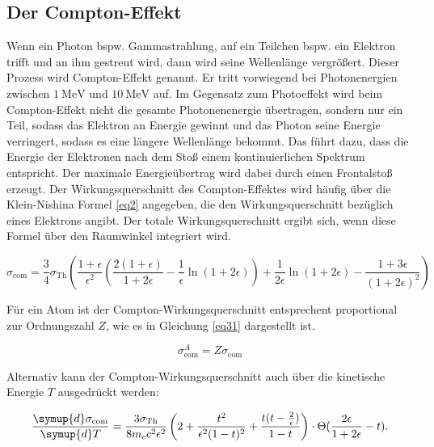 \subsection{Der Compton-Effekt}
Wenn ein Photon bspw. Gammastrahlung, auf ein Teilchen bspw. ein Elektron trifft
und an ihm gestreut wird, dann wird seine Wellenlänge vergrößert. 
Dieser Prozess wird Compton-Effekt genannt.
Er tritt vorwiegend bei Photonenergien zwischen $\SI{1}{\mega\electronvolt}$ und 
$\SI{10}{\mega\electronvolt}$ auf.
Im Gegensatz zum Photoeffekt wird beim Compton-Effekt nicht die 
gesamte Photonenenergie übertragen, sondern nur ein Teil, sodass das Elektron an 
Energie gewinnt und das Photon seine Energie verringert, sodass es eine längere 
Wellenlänge bekommt. Das führt dazu, dass die Energie der Elektronen nach dem 
Stoß einem kontinuierlichen Spektrum entspricht.
Der maximale Energieübertrag wird dabei durch einen Frontalstoß erzeugt.
Der Wirkungsquerschnitt des Compton-Effektes wird häufig über die 
Klein-Nishina Formel \ref{eq2} angegeben, die den Wirkungsquerschnitt bezüglich 
eines Elektrons angibt. Der totale Wirkungsquerschnitt ergibt sich, wenn diese 
Formel über den Raumwinkel integriert wird.

\begin{equation}
    \sigma_{\text{com}} = \frac{3}{4}\sigma_{\text{Th}} \left(\frac{1 + \epsilon}{\epsilon^2} \left(\frac{2(1+\epsilon)}{1+2\epsilon} - \frac{1}{\epsilon} \ln(1+2\epsilon) \right) + \frac{1}{2\epsilon} \ln(1+2\epsilon) - \frac{1+3\epsilon}{(1+2\epsilon)^2} \right)
    \label{eq2}
\end{equation}

Für ein Atom ist der Compton-Wirkungsquerschnitt entsprechent proportional zur 
Ordnungszahl $Z$, wie es in Gleichung \eqref{eq31} dargestellt ist.

\begin{equation}
    \sigma^A_{\text{com}} = Z \sigma_{\text{com}}
    \label{eq31}
\end{equation}

Alternativ kann der Compton-Wirkungsquerschnitt auch über die kinetische 
Energie $T$ ausgedrückt werden:

\begin{equation}
    \frac{\symup{d} \sigma_{\text{com}}}{\symup{d}T} = \frac{3\sigma_{\text{Th}}}{8 m_{\text{e}} c^2 \epsilon^2} \left(2+ \frac{t^2}{\epsilon^2(1-t)^2} + \frac{t(t-\frac{2}{\epsilon})}{1-t} \right) \cdot \Theta( \frac{2 \epsilon}{1+ 2 \epsilon}-t).
    \label{2.12}
\end{equation}

